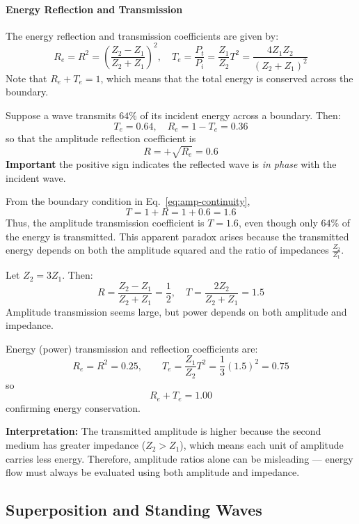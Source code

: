 \documentclass[11pt]{report}
\begin{document}
\paragraph{Energy Reflection and Transmission} The energy reflection and transmission coefficients are given by:
\begin{equation}\label{eq:energy_coeff}
    R_e = R^2 = \left(\frac{Z_2 - Z_1}{Z_2 + Z_1}\right)^2, \quad T_e = \frac{P_t}{P_i} = \frac{Z_1}{Z_2} T^2 = \frac{4Z_1 Z_2}{(Z_2 + Z_1)^2}
\end{equation}
Note that \( R_e + T_e = 1 \), which means that the total energy is conserved across the boundary.

\begin{example}
Suppose a wave transmits \(64\%\) of its incident energy across a boundary. Then:
$$
    T_e = 0.64, 
    \quad R_e = 1 - T_e = 0.36
$$
so that the amplitude reflection coefficient is
$$
    R = +\sqrt{R_e} = 0.6 
$$
\textbf{Important} the positive sign indicates the reflected wave is \emph{in phase} with the incident wave.

From the boundary condition in Eq.~\eqref{eq:amp-continuity},
$$
    T = 1 + R = 1 + 0.6 = 1.6
$$
Thus, the amplitude transmission coefficient is \(T = 1.6\), even though only \(64\%\) of the energy is transmitted. This apparent paradox arises because the transmitted energy depends on both the amplitude squared and the ratio of impedances \(\tfrac{Z_2}{Z_1}\).
\end{example}
\begin{example}
Let \(Z_2 = 3Z_1\). Then:
\[
R = \frac{Z_2 - Z_1}{Z_2 + Z_1} = \frac{1}{2}, 
\quad T = \frac{2Z_2}{Z_2 + Z_1} = 1.5
\]
Amplitude transmission seems large, but power depends on both amplitude and impedance.

Energy (power) transmission and reflection coefficients are:
\[
R_e = R^2 = 0.25, \qquad 
T_e = \frac{Z_1}{Z_2} T^2 = \frac{1}{3}(1.5)^2 = 0.75
\]
so
\[
R_e + T_e = 1.00
\]
confirming energy conservation.

\textbf{Interpretation:}
The transmitted amplitude is higher because the second medium has greater impedance (\(Z_2 > Z_1\)), which means each unit of amplitude carries less energy. Therefore, amplitude ratios alone can be misleading — energy flow must always be evaluated using both amplitude and impedance.
\end{example}
\subsection{Superposition and Standing Waves}
\end{document}
